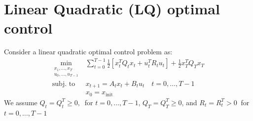 \documentclass[openany]{book}
\theoremstyle{definition}
\theoremstyle{remark}
\begin{document}
\chapter{Linear Quadratic (LQ) optimal control}

Consider a linear quadratic optimal control problem as: 
\begin{align*}
        \min_{\substack{x_1,\dots,x_T \\ u_0,\dots,u_{T-1}}} & \displaystyle\sum_{t=0}^{T-1}\displaystyle\frac{1}{2}[x_t^TQ_tx_t+u_t^TR_tu_t] + \displaystyle\frac{1}{2}x_T^TQ_Tx_T\\
        \text{subj. to } & x_{t+1} = A_tx_t + B_tu_t \quad t=0,\dots,T-1\\
                        &x_0 = x_{\text{init}}
\end{align*}
We assume $Q_t=Q_t^T\geq 0,\ $ for $ t=0,\dots,T-1$, $Q_T = Q_T^T \geq 0$, and $R_t=R_t^T > 0 \ $ for $t=0,\dots,T-1$
\end{document}
